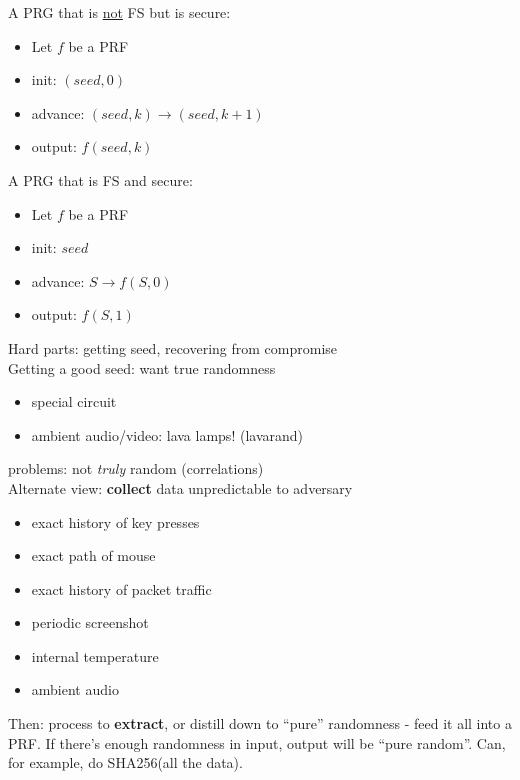 \begin{example}{A PRG that is \underline{not} FS but is secure:}
    \begin{itemize}
    \item Let $f$ be a PRF
    \item init: $(seed, 0)$
    \item advance: $(seed, k) \rightarrow (seed, k + 1)$
    \item output: $f(seed, k)$
    \end{itemize}
\end{example}

\begin{example}{A PRG that is FS and secure:}
    \begin{itemize}
    \item Let $f$ be a PRF
    \item init: $seed$
    \item advance: $S \rightarrow f(S, 0)$
    \item output: $f(S, 1)$
    \end{itemize}
\end{example}

Hard parts: getting seed, recovering from compromise\\

Getting a good seed: want true randomness
\begin{itemize}
    \item special circuit
    \item ambient audio/video: lava lamps! (lavarand)
\end{itemize}
problems: not \emph{truly} random (correlations)\\

Alternate view: \textbf{collect} data unpredictable to adversary
\begin{itemize}
    \item exact history of key presses
    \item exact path of mouse
    \item exact history of packet traffic
    \item periodic screenshot
    \item internal temperature
    \item ambient audio
\end{itemize}


Then: process to \textbf{extract}, or distill down to ``pure''
randomness - feed it all into a PRF. If there's enough randomness in
input, output will be ``pure random''.  Can, for example, do
SHA256(all the data).\\

